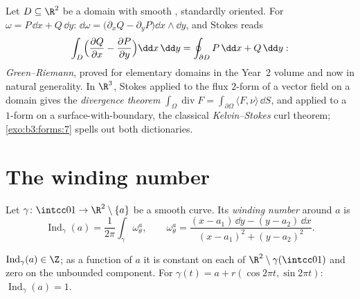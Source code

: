\begin{example}
\label{ex:b3:forms:classical}
Let $D \subseteq \R^2$ be a  domain with smooth
, standardly oriented. For $\omega = P\,\dd x +
Q\,\dd y$: $\dd\omega = \bigl(\partial_xQ -
\partial_yP\bigr)\dd x\wedge\dd y$, and Stokes reads
\[
\int_D\Bigl(\frac{\partial Q}{\partial x} -
\frac{\partial P}{\partial y}\Bigr)\dd x\,\dd y
= \oint_{\partial D}P\,\dd x + Q\,\dd y :
\]
\emph{Green--Riemann}, proved for elementary domains in the
Year~2 volume and now in natural generality. In $\R^3$,
Stokes applied to the flux $2$-form of a vector field on a
 domain gives the \emph{divergence theorem}
$\int_\Omega\operatorname{div}F =
\int_{\partial\Omega}\langle F, \nu\rangle\,\dd S$, and
applied to a $1$-form on a surface-with-boundary, the
classical \emph{Kelvin--Stokes} curl theorem;
\cref{exo:b3:forms:7} spells out both dictionaries.
\end{example}

\section{The winding number}\label{sec:b3:forms:winding}

\begin{definition}\label{def:b3:forms:winding}
Let $\gamma\colon\intcc01\to\R^2\setminus\{a\}$ be a smooth
 curve. Its \emph{winding number} around $a$ is
\[
\operatorname{Ind}_\gamma(a) =
\frac1{2\pi}\int_\gamma\omega_\theta^a,
\qquad
\omega_\theta^a = \frac{(x - a_1)\,\dd y - (y - a_2)\,\dd
x}{(x - a_1)^2 + (y - a_2)^2} .
\]
\end{definition}

\begin{proposition}\label{prop:b3:forms:windinginteger}
$\operatorname{Ind}_\gamma(a) \in \Z$; as a function of $a$
it is constant on each  of
$\R^2\setminus\gamma(\intcc01)$ and zero on the unbounded
component. For $\gamma(t) = a + r(\cos2\pi t, \sin2\pi t)$:
$\operatorname{Ind}_\gamma(a) = 1$.
\end{proposition}

